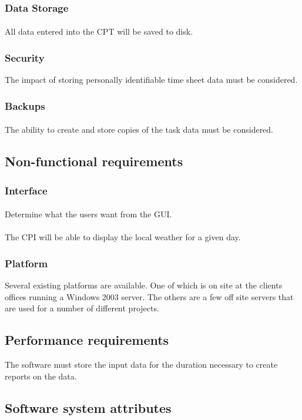 \documentclass[12pt]{article}
\begin{document}
\subsubsection{Data Storage}\label{sec:Data Storage}
\paragraph{} All data entered into the CPT will be saved to disk.


\subsubsection{Security}\label{sec:Security}
The impact of storing personally identifiable time sheet data must be considered.

\subsubsection{Backups}\label{sec:Backups}
\paragraph{} The ability to create and store copies of the task data must be considered.

\subsection{Non-functional requirements}
\subsubsection{Interface}\label{sec:Interface}
\paragraph{} Determine what the users want from the GUI.
\paragraph{} The CPI will be able to display the local weather for a given day.

\subsubsection{Platform}\label{sec:Platform}
Several existing platforms are available. One of which is on site at the clients offices running a Windows 2003 server. The others are a few off site servers that are used for a number of different projects.

\subsection{Performance requirements}
The software must store the input data for the duration necessary to create reports on the data.

\subsection{Software system attributes}
\end{document}
